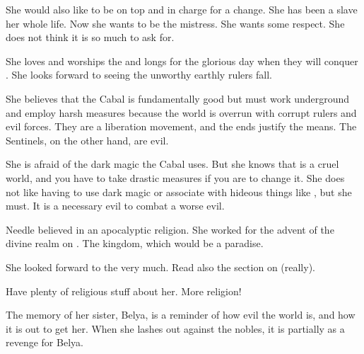 She would also like to be on top and in charge for a change. 
She has been a slave her whole life. 
Now she wants to be the mistress. 
She wants some respect. 
She does not think it is so much to ask for. 

She loves and worships the \resphain{} and longs for the glorious day when they will conquer \Miith{}. 
She looks forward to seeing the unworthy earthly rulers fall. 

She believes that the Cabal is fundamentally good but must work underground and employ harsh measures because the world is overrun with corrupt rulers and evil forces. 
They are a liberation movement, and the ends justify the means. 
The Sentinels, on the other hand, are evil. 

She is afraid of the dark magic the Cabal uses.
But she knows that \Miith is a cruel world, and you have to take drastic measures if you are to change it.
She does not like having to use dark magic or associate with hideous things like \banes, but she must. 
It is a necessary evil to combat a worse evil. 

Needle believed in an apocalyptic religion.
She worked for the advent of the divine realm on \Miith.
The \resphan kingdom, which would be a paradise.

She looked forward to the  very much. 
Read also the section on  (really). 

Have plenty of religious stuff about her.
More religion!

The memory of her sister, Belya, is a reminder of how evil the world is, and how it is out to get her. 
When she lashes out against the nobles, it is partially as a revenge for Belya. 

